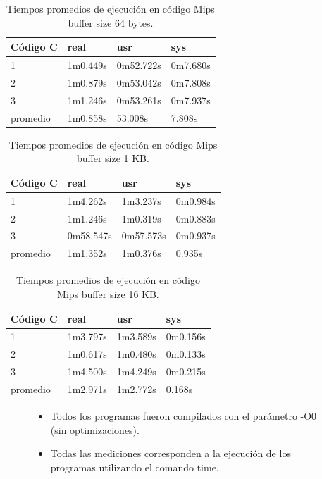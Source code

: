 \documentclass{article}
\begin{document}
\begin{table}[htbp]
\begin{center}
\begin{tabular}{|l|l|l|l|}
\hline
Código C & real & usr & sys \\
\hline \hline
1 & 1m0.449s & 0m52.722s & 0m7.680s \\ \hline
2 & 1m0.879s & 0m53.042s & 0m7.808s \\ \hline
3 & 1m1.246s & 0m53.261s & 0m7.937s \\ \hline
promedio & 1m0.858s & 53.008s & 7.808s
\end{tabular}
\caption{Tiempos promedios de ejecución en código Mips buffer size 64 bytes.}
\end{center}
\end{table}

\begin{table}[htbp]
\begin{center}
\begin{tabular}{|l|l|l|l|}
\hline
Código C & real & usr & sys \\
\hline \hline
1 & 1m4.262s & 1m3.237s & 0m0.984s \\ \hline
2 & 1m1.246s & 1m0.319s & 0m0.883s \\ \hline
3 & 0m58.547s & 0m57.573s & 0m0.937s \\ \hline
promedio & 1m1.352s & 1m0.376s & 0.935s
\end{tabular}
\caption{Tiempos promedios de ejecución en código Mips buffer size 1 KB.}
\end{center}
\end{table}

\begin{table}[htbp]
\begin{center}
\begin{tabular}{|l|l|l|l|}
\hline
Código C & real & usr & sys \\
\hline \hline
1 & 1m3.797s & 1m3.589s & 0m0.156s \\ \hline
2 & 1m0.617s & 1m0.480s & 0m0.133s \\ \hline
3 & 1m4.500s & 1m4.249s & 0m0.215s \\ \hline
promedio & 1m2.971s & 1m2.772s & 0.168s
\end{tabular}
\caption{Tiempos promedios de ejecución en código Mips buffer size 16 KB.}
\end{center}
\end{table}

\begin{figure}
\begin{itemize}
\item Todos los programas fueron compilados con el parámetro -O0 (sin optimizaciones).
\item Todas las mediciones corresponden a la ejecución de los programas utilizando el comando time.
\end{itemize}
\end{figure}
\end{document}
